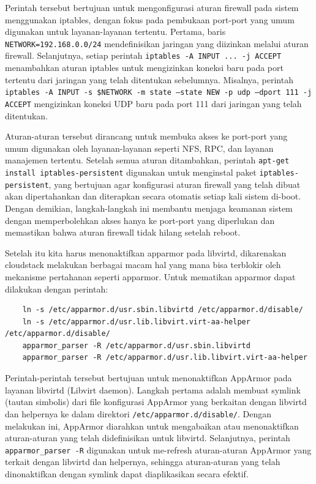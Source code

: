 Perintah tersebut bertujuan untuk mengonfigurasi aturan firewall pada sistem menggunakan iptables, dengan fokus pada pembukaan port-port yang umum digunakan untuk layanan-layanan tertentu. Pertama, baris \texttt{NETWORK=192.168.0.0/24} mendefinisikan jaringan yang diizinkan melalui aturan firewall. Selanjutnya, setiap perintah \texttt{iptables -A INPUT ... -j ACCEPT} menambahkan aturan iptables untuk mengizinkan koneksi baru pada port tertentu dari jaringan yang telah ditentukan sebelumnya. Misalnya, perintah \texttt{iptables -A INPUT -s \$NETWORK -m state --state NEW -p udp --dport 111 -j ACCEPT} mengizinkan koneksi UDP baru pada port 111 dari jaringan yang telah ditentukan.

Aturan-aturan tersebut dirancang untuk membuka akses ke port-port yang umum digunakan oleh layanan-layanan seperti NFS, RPC, dan layanan manajemen tertentu. Setelah semua aturan ditambahkan, perintah \texttt{apt-get install iptables-persistent} digunakan untuk menginstal paket \texttt{iptables-persistent}, yang bertujuan agar konfigurasi aturan firewall yang telah dibuat akan dipertahankan dan diterapkan secara otomatis setiap kali sistem di-boot. Dengan demikian, langkah-langkah ini membantu menjaga keamanan sistem dengan memperbolehkan akses hanya ke port-port yang diperlukan dan memastikan bahwa aturan firewall tidak hilang setelah reboot.

Setelah itu kita harus menonaktifkan apparmor pada libvirtd, dikarenakan cloudstack melakukan berbagai macam hal yang mana bisa terblokir oleh mekanisme pertahanan seperti apparmor\cite{apacheHostInstallation}. Untuk mematikan apparmor dapat dilakukan dengan perintah:

\begin{lstlisting}
    ln -s /etc/apparmor.d/usr.sbin.libvirtd /etc/apparmor.d/disable/
    ln -s /etc/apparmor.d/usr.lib.libvirt.virt-aa-helper /etc/apparmor.d/disable/
    apparmor_parser -R /etc/apparmor.d/usr.sbin.libvirtd
    apparmor_parser -R /etc/apparmor.d/usr.lib.libvirt.virt-aa-helper
\end{lstlisting}

Perintah-perintah tersebut bertujuan untuk menonaktifkan AppArmor pada layanan libvirtd (Libvirt daemon). Langkah pertama adalah membuat symlink (tautan simbolis) dari file konfigurasi AppArmor yang berkaitan dengan libvirtd dan helpernya ke dalam direktori \texttt{/etc/apparmor.d/disable/}. Dengan melakukan ini, AppArmor diarahkan untuk mengabaikan atau menonaktifkan aturan-aturan yang telah didefinisikan untuk libvirtd. Selanjutnya, perintah \texttt{apparmor\_parser -R} digunakan untuk me-refresh aturan-aturan AppArmor yang terkait dengan libvirtd dan helpernya, sehingga aturan-aturan yang telah dinonaktifkan dengan symlink dapat diaplikasikan secara efektif.

